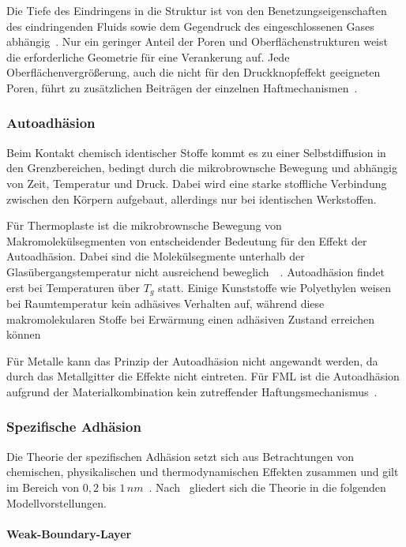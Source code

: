 Die Tiefe des Eindringens in die Struktur ist von den Benetzungseigenschaften des eindringenden Fluids sowie dem Gegendruck des eingeschlossenen Gases abhängig~\cite{Mittal1999}.
Nur ein geringer Anteil der Poren und Oberflächenstrukturen weist die erforderliche Geometrie für eine Verankerung auf.
Jede Oberflächenvergrößerung, auch die nicht für den Druckknopfeffekt geeigneten Poren, führt zu zusätzlichen Beiträgen der einzelnen Haftmechanismen~\cite{Flock2012}.

\subsubsection{Autoadhäsion}\label{subsubsec:autoadhäsion}

Beim Kontakt chemisch identischer Stoffe kommt es zu einer Selbstdiffusion in den Grenzbereichen, bedingt durch die mikrobrownsche Bewegung und abhängig von Zeit, Temperatur und Druck.
Dabei wird eine starke stoffliche Verbindung zwischen den Körpern aufgebaut, allerdings nur bei identischen Werkstoffen.

Für Thermoplaste ist die mikrobrownsche Bewegung von Makromolekülsegmenten von entscheidender Bedeutung für den Effekt der Autoadhäsion.
Dabei sind die Molekülsegmente unterhalb der Glasübergangstemperatur  nicht ausreichend beweglich~\cite{Seidler1971}~.
Autoadhäsion findet erst bei Temperaturen über $T_g$ statt.
Einige Kunststoffe wie Polyethylen weisen bei Raumtemperatur kein adhäsives Verhalten auf, während diese makromolekularen Stoffe bei Erwärmung einen adhäsiven Zustand erreichen können~\cite{Seidler1971}

Für Metalle kann das Prinzip der Autoadhäsion nicht angewandt werden, da durch das Metallgitter die Effekte nicht eintreten.
Für FML ist die Autoadhäsion aufgrund der Materialkombination kein zutreffender Haftungsmechanismus~\cite{Flock2012}.

\subsubsection{Spezifische Adhäsion} \label{subsubsec:spez}

Die Theorie der spezifischen Adhäsion setzt sich aus Betrachtungen von chemischen, physikalischen und thermodynamischen Effekten zusammen und gilt im Bereich von $0,2$ bis $1\,nm$~.
Nach~\cite{Garbassi1998} gliedert sich die Theorie in die folgenden Modellvorstellungen.

\paragraph{Weak-Boundary-Layer}

